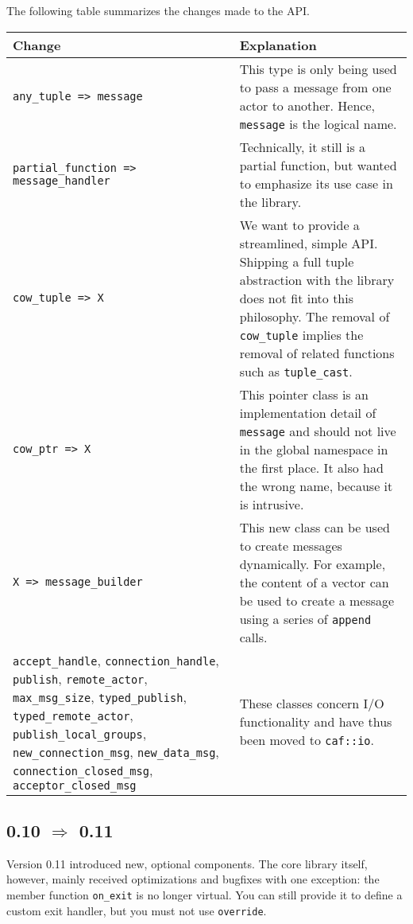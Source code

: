 The following table summarizes the changes made to the API.

\begin{tabular*}{\textwidth}{m{}m{}}
  Change & Explanation \\
  \hline
  \lstinline^any_tuple => message^ & This type is only being used to pass a message from one actor to another. Hence, \lstinline^message^ is the logical name. \\
  \hline
  \lstinline^partial_function => ^ \lstinline^message_handler^ & Technically, it still is a partial function, but wanted to emphasize its use case in the library. \\
  \hline
  \lstinline^cow_tuple => X^ & We want to provide a streamlined, simple API. Shipping a full tuple abstraction with the library does not fit into this philosophy. The removal of \lstinline^cow_tuple^ implies the removal of related functions such as \lstinline^tuple_cast^. \\
  \hline
  \lstinline^cow_ptr => X^ & This pointer class is an implementation detail of \lstinline^message^ and should not live in the global namespace in the first place. It also had the wrong name, because it is intrusive. \\
  \hline
  \lstinline^X => message_builder^ & This new class can be used to create messages dynamically. For example, the content of a vector can be used to create a message using a series of \lstinline^append^ calls. \\
  \hline
  \lstinline^accept_handle^, \lstinline^connection_handle^, \lstinline^publish^, \lstinline^remote_actor^, \lstinline^max_msg_size^, \lstinline^typed_publish^, \lstinline^typed_remote_actor^, \lstinline^publish_local_groups^, \lstinline^new_connection_msg^, \lstinline^new_data_msg^, \lstinline^connection_closed_msg^, \lstinline^acceptor_closed_msg^ & These classes concern I/O functionality and have thus been moved to \lstinline^caf::io^. \\
  \hline
\end{tabular*}

\subsection{0.10 $\Rightarrow$ 0.11}

Version 0.11 introduced new, optional components.
The core library itself, however, mainly received optimizations and bugfixes with one exception: the member function \lstinline^on_exit^ is no longer virtual.
You can still provide it to define a custom exit handler, but you must not use \lstinline^override^.

